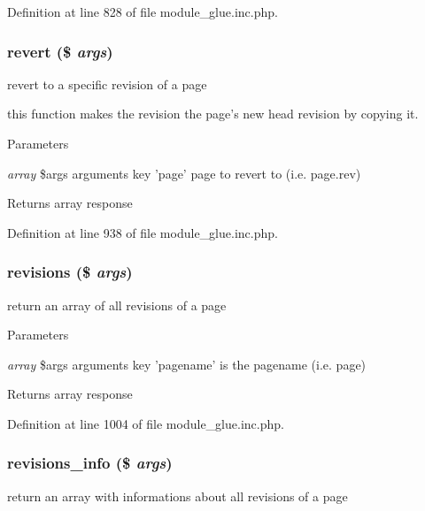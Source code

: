 Definition at line 828 of file module\_\-glue.inc.php.

\hypertarget{module__glue_8inc_8php_ae69e25beb40feedc02d3b850587d20cc}{
\subsubsection[{revert}]{\setlength{\rightskip}{0pt plus 5cm}revert (\$ {\em args})}}
\label{module__glue_8inc_8php_ae69e25beb40feedc02d3b850587d20cc}
revert to a specific revision of a page

this function makes the revision the page's new head revision by copying it. 
\begin{DoxyParams}{Parameters}
\item[{\em array}]\$args arguments key 'page' page to revert to (i.e. page.rev) \end{DoxyParams}
\begin{DoxyReturn}{Returns}
array response 
\end{DoxyReturn}


Definition at line 938 of file module\_\-glue.inc.php.

\hypertarget{module__glue_8inc_8php_a27d90d2ed1b4142554bc4e0e47e9ba0c}{
\subsubsection[{revisions}]{\setlength{\rightskip}{0pt plus 5cm}revisions (\$ {\em args})}}
\label{module__glue_8inc_8php_a27d90d2ed1b4142554bc4e0e47e9ba0c}
return an array of all revisions of a page


\begin{DoxyParams}{Parameters}
\item[{\em array}]\$args arguments key 'pagename' is the pagename (i.e. page) \end{DoxyParams}
\begin{DoxyReturn}{Returns}
array response 
\end{DoxyReturn}


Definition at line 1004 of file module\_\-glue.inc.php.

\hypertarget{module__glue_8inc_8php_a1dc65b69a920ac4ebc8f7c1df305060b}{
\subsubsection[{revisions\_\-info}]{\setlength{\rightskip}{0pt plus 5cm}revisions\_\-info (\$ {\em args})}}
\label{module__glue_8inc_8php_a1dc65b69a920ac4ebc8f7c1df305060b}
return an array with informations about all revisions of a page


